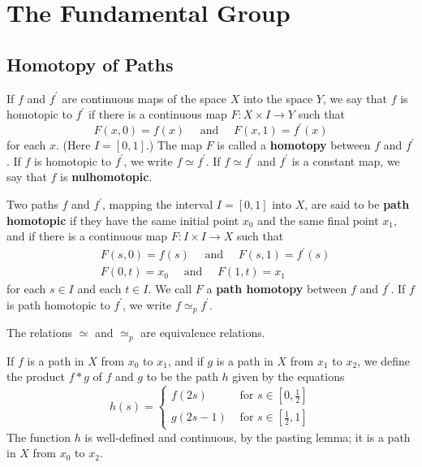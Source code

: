 \documentclass[12pt, a4paper, oneside]{book}
\begin{document}
\chapter{The Fundamental Group}

\section{Homotopy of Paths}
\begin{definition}
    If $f$ and $f^{\prime}$ are continuous maps of the space $X$ into the space $Y$, we say that $f$ is homotopic to $f^{\prime}$ if there is a continuous map $F : X \times I \rightarrow Y$ such that
    \begin{equation*}
        F(x, 0)=f(x) \quad \text { and } \quad F(x, 1)=f^{\prime}(x)
    \end{equation*}
    for each $x$. (Here $I=[0,1]$.) The map $F$ is called a \textbf{homotopy} between $f$ and $f^{\prime}$.
    If $f$ is homotopic to $f^{\prime}$, we write $f \simeq f^{\prime}$. If $f \simeq f^{\prime}$ and $f^{\prime}$ is a constant map, we say that $f$ is \textbf{nulhomotopic}.

    Two paths $f$ and $f^{\prime}$, mapping the interval $I=[0,1]$ into $X$, are said to be \textbf{path homotopic} if they have the same initial point $x_0$ and the same final point $x_1$, and if there is a continuous map $F: I \times I \rightarrow X$ such that
    \begin{equation*}
        \begin{aligned}
             & F(s, 0)=f(s) \quad \text { and } \quad F(s, 1)=f^{\prime}(s) \\
             & F(0, t)=x_0 \quad \text { and } \quad F(1, t)=x_1
        \end{aligned}
    \end{equation*}
    for each $s \in I$ and each $t \in I$. We call $F$ a \textbf{path homotopy} between $f$ and $f^{\prime}$. If $f$ is path homotopic to $f^{\prime}$, we write $f \simeq_p f^{\prime}$.
\end{definition}


\begin{lemma}
    The relations $\simeq$ and $\simeq_p$ are equivalence relations.
\end{lemma}

\begin{definition}
    If $f$ is a path in $X$ from $x_0$ to $x_1$, and if $g$ is a path in $X$ from $x_1$ to $x_2$, we define the product $f * g$ of $f$ and $g$ to be the path $h$ given by the equations
    \begin{equation*}
        h(s)= \begin{cases}f(2 s) & \text { for } s \in\left[0, \frac{1}{2}\right] \\ g(2 s-1) & \text { for } s \in\left[\frac{1}{2}, 1\right]\end{cases}
    \end{equation*}
    The function $h$ is well-defined and continuous, by the pasting lemma; it is a path in $X$ from $x_0$ to $x_2$.


\end{definition}
\end{document}
